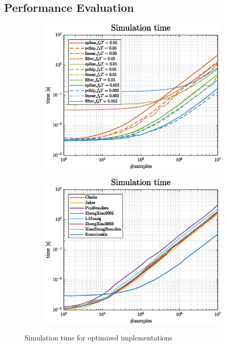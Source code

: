 \subsection{Performance Evaluation}

\begin{figure}
	\hfill
	\begin{subfigure}[t]{.49\linewidth}
		\centering
		\includegraphics[width=\linewidth]{img/simTime_Komninakis.eps}
		\label{fig:KomninakisSimTime}
	\end{subfigure}
	\hfill
	\begin{subfigure}[t]{.49\linewidth}
		\centering
		\includegraphics[width=\linewidth]{img/simTime.eps}
		\label{fig:overallSimTime}
	\end{subfigure}
	\hfill
	
	\caption{Simulation time for optimized implementations}
	\label{fig:simTime}
\end{figure}

